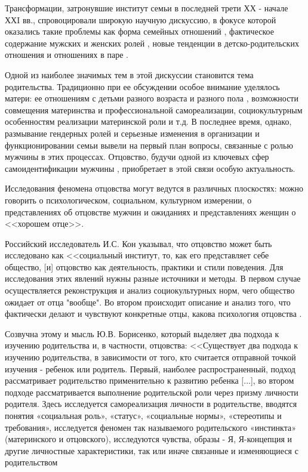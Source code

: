\documentclass{../../common/thesisbyxetex}
\begin{document}
Трансформации, затронувшие институт семьи в последней трети ХХ - начале ХХI вв.,  спровоцировали 
широкую научную дискуссию, в фокусе которой оказались такие проблемы как форма семейных 
отношений \cite{gay, legfat}, фактическое содержание мужских и женских ролей \cite{mercoh, percep}, 
новые тенденции в детско-родительских отношения и отношениях в паре \cite{relot, sex}.

Одной из наиболее значимых тем в этой дискуссии становится тема родительства. Традиционно при ее 
обсуждении особое внимание уделялось матери: ее отношениям с детьми разного возраста и разного 
пола \cite{maler}, возможности совмещения материнства и профессиональной самореализации, 
социокультурным особенностям реализации материнской роли и т.д. В последнее время, однако, 
размывание гендерных ролей и серьезные изменения в организации и функционировании семьи 
вывели на первый план вопросы, связанные с ролью мужчины в этих процессах. Отцовство, будучи одной 
из ключевых сфер самоидентификации мужчины \cite{imaf}, приобретает в этой связи особую 
актуальность.

Исследования феномена отцовства могут ведутся  в различных плоскостях: можно говорить о 
психологическом, социальном, культурном измерении, о представлениях об отцовстве мужчин и ожиданиях 
и представлениях женщин о <<хорошем отце>>.

Российский исследователь И.С. Кон указывал, что отцовство может быть исследовано как <<социальный 
институт, то, как его представляет себе общество, [и] отцовство как деятельность, практики и 
стили поведения. Для исследования этих явлений нужны разные источники и методы. В первом случае 
осуществляется реконструкция и анализ социокультурных норм, чего общество ожидает от отца "вообще". 
Во втором происходит описание и анализ того, что фактически делают и чувствуют конкретные отцы, 
какова психология отцовства \cite[3]{konot}.

Созвучна этому и мысль Ю.В. Борисенко, который выделяет два подхода к изучению родительства и, в 
частности, отцовства: <<Существует два подхода к изучению родительства, в зависимости от того, кто 
считается отправной точкой изучения - ребенок или родитель. Первый, наиболее распространенный, 
подход рассматривает родительство применительно к развитию ребенка [...], во втором подходе 
рассматривается выполнение родительской роли через призму личности родителя. Здесь исследуется 
самореализация личности в родительстве, вводятся понятия «социальная роль», «статус», «социальные 
нормы», «стереотипы и требования», исследуется феномен так называемого родительского «инстинкта»
(материнского и отцовского), исследуются чувства, образы - Я, Я-концепция и другие личностные 
характеристики, так или иначе связанные и изменяющиеся с родительством \cite[11]{psyot}
\end{document}
